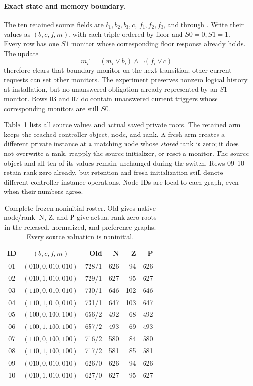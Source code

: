 \paragraph{Exact state and memory boundary.}
The ten retained source fields are $b_1,b_2,b_3,c$, $f_1,f_2,f_3$, and
 through
. Write their values as
$(b,c,f,m)$, with each triple ordered by floor and $S0=0,S1=1$.
Every row has one $S1$ monitor whose corresponding floor response already
holds. The update
\[
 m_i'=(m_i\lor b_i)\land\neg(f_i\lor c)
\]
therefore clears that boundary monitor on the next transition; other
current requests can set other monitors. The experiment preserves
nonzero logical history at installation, but no unanswered obligation
already represented by an $S1$ monitor. Rows 03 and 07 do contain
unanswered current triggers whose corresponding monitors are still $S0$.

Table~\ref{tab:noninitial-roster} lists all source values and actual saved
private roots. The retained arm keeps the reached controller object,
node, and rank. A fresh arm creates a different private instance at a
matching node whose \emph{stored} rank is zero; it does not overwrite a
rank, reapply the source initializer, or reset a monitor. The source
object and all ten of its values remain unchanged during the switch.
Rows 09--10 retain rank zero already, but retention and fresh
initialization still denote different controller-instance operations.
Node IDs are local to each graph, even when their numbers agree.

\begin{table}[htbp]
\centering\small
\caption{Complete frozen noninitial roster. Old gives native node/rank;
N, Z, and P give actual rank-zero roots in the released, normalized,
and preference graphs. Every source valuation is noninitial.}
\label{tab:noninitial-roster}
\begin{tabular}{@{}ccrrrr@{}}
\toprule
ID & $(b,c,f,m)$ & Old & N & Z & P\\
\midrule
01 & $(010,0,010,010)$ & 728/1 & 626 & 94 & 626 \\
02 & $(010,1,010,010)$ & 729/1 & 627 & 95 & 627 \\
03 & $(110,0,010,010)$ & 730/1 & 646 & 102 & 646 \\
04 & $(110,1,010,010)$ & 731/1 & 647 & 103 & 647 \\
05 & $(100,0,100,100)$ & 656/2 & 492 & 68 & 492 \\
06 & $(100,1,100,100)$ & 657/2 & 493 & 69 & 493 \\
07 & $(110,0,100,100)$ & 716/2 & 580 & 84 & 580 \\
08 & $(110,1,100,100)$ & 717/2 & 581 & 85 & 581 \\
09 & $(010,0,010,010)$ & 626/0 & 626 & 94 & 626 \\
10 & $(010,1,010,010)$ & 627/0 & 627 & 95 & 627 \\
\bottomrule
\end{tabular}
\end{table}

